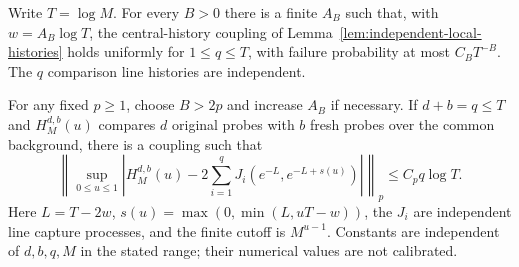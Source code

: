 \documentclass[11pt,letterpaper]{article}
\begin{document}
\begin{lemma}
\label{lem:logarithmic-probe-comparison}
Write $T=\log M$. For every $B>0$ there is a finite $A_B$ such
that, with $w=A_B\log T$, the central-history coupling of
Lemma~\ref{lem:independent-local-histories} holds uniformly
for $1\le q\le T$, with failure probability at most
$C_BT^{-B}$. The $q$ comparison line histories are independent.

For any fixed $p\ge1$, choose $B>2p$ and increase $A_B$ if
necessary. If $d+b=q\le T$ and $H_M^{d,b}(u)$ compares $d$ original
probes with $b$ fresh probes over the common background, there
is a coupling such that
\begin{equation}\label{eq:logarithmic-probe-Lp}
 \left\|\sup_{0\le u\le1}
 \left|H_M^{d,b}(u)-2\sum_{i=1}^q J_i(e^{-L},e^{-L+s(u)})\right|
                                      \right\|_p
        \le C_pq\log T.
\end{equation}
Here $L=T-2w$, $s(u)=\max(0,\min(L,uT-w))$, the $J_i$ are
independent line capture processes, and the finite cutoff is
$M^{u-1}$. Constants are independent of $d,b,q,M$ in the stated
range; their numerical values are not calibrated.
\end{lemma}
\end{document}
